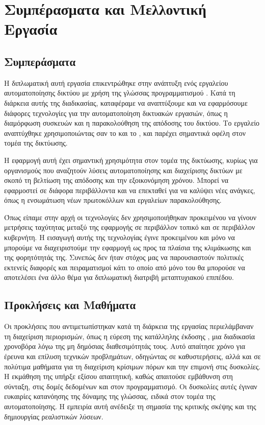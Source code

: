 
\chapter{Συμπέρασματα και Μελλοντική Εργασία}

\section{Συμπεράσματα}

Η διπλωματική αυτή εργασία επικεντρώθηκε στην ανάπτυξη ενός εργαλείου αυτοματοποίησης 
δικτύου με χρήση της γλώσσας προγραμματισμού . 
Κατά τη διάρκεια αυτής της διαδικασίας, καταφέραμε να αναπτύξουμε και να 
εφαρμόσουμε διάφορες τεχνολογίες για την αυτοματοποίηση δικτυακών εργασιών, 
όπως η διαμόρφωση συσκευών και η παρακολούθηση της απόδοσης του δικτύου. 
Το εργαλείο αναπτύχθηκε χρησιμοποιώντας σαν  το  και το , 
και παρέχει σημαντικά οφέλη στον τομέα της δικτύωσης.


Η εφαρμογή αυτή έχει σημαντική χρησιμότητα στον τομέα της δικτύωσης, 
κυρίως για οργανισμούς που αναζητούν λύσεις αυτοματοποίησης και 
διαχείρισης δικτύων με σκοπό τη βελτίωση της απόδοσης και την 
εξοικονόμηση χρόνου. Μπορεί να εφαρμοστεί σε διάφορα περιβάλλοντα και 
να επεκταθεί για να καλύψει νέες ανάγκες, όπως η ενσωμάτωση νέων πρωτοκόλλων 
και εργαλείων παρακολούθησης.

Όπως είπαμε στην αρχή οι τεχνολογίες  δεν χρησιμοποιήθηκαν προκειμένου
να γίνουν μετρήσεις ταχύτητας μεταξύ της εφαρμογής σε περιβάλλον τοπικό και σε περιβάλλον κυβερνήτη.
Η εισαγωγή αυτής της τεχνολογίας έγινε προκειμένου και μόνο να μπορούμε να διαχειριστούμε την εφαρμογή
ως προς τα πλαίσια της κλιμάκωσης και της φορητότητάς της. Συνεπώς δεν ήταν στόχος μας να παρουσιαστούν πολιτικές
εκτενείς διαφορές και πειραματισμοί κάτι το οποίο από μόνο του θα μπορούσε να αποτελέσει ένα άλλο θέμα για
διπλωματική διατριβή μεταπτυχιακού επιπέδου.

\section{Προκλήσεις και Μαθήματα}


Οι προκλήσεις που αντιμετωπίστηκαν κατά τη διάρκεια της 
εργασίας περιελάμβαναν τη διαχείριση περιορισμών, όπως η 
εύρεση της κατάλληλης έκδοσης , μια διαδικασία 
χρονοβόρα λόγω της μη δημόσιας διαθεσιμότητάς τους. 
Αυτό απαίτησε χρόνο για έρευνα και επίλυση τεχνικών προβλημάτων, 
οδηγώντας σε καθυστερήσεις, αλλά και σε πολύτιμα μαθήματα για τη 
διαχείριση κρίσιμων πόρων και την επιμονή στις δυσκολίες. Η εκμάθηση 
της  υπήρξε εξίσου απαιτητική, καθώς απαιτούσε 
εμβάθυνση στη σύνταξη, στις δομές δεδομένων και στον προγραμματισμό. 
Οι δυσκολίες αυτές έγιναν ευκαιρίες κατανόησης της δύναμης της 
γλώσσας, ειδικά στον τομέα της αυτοματοποίησης. Η εμπειρία αυτή 
ανέδειξε τη σημασία της κριτικής σκέψης και της δημιουργίας 
ρεαλιστικών λύσεων.

